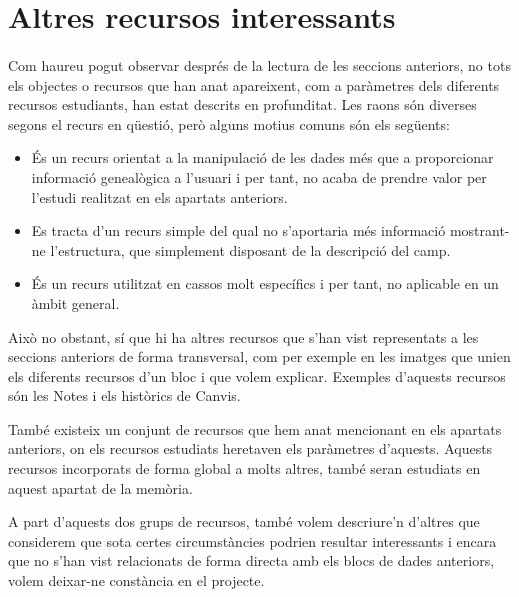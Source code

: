 \section{Altres recursos interessants}

    \paragraph{}
    Com haureu pogut observar després de la lectura de les seccions anteriors, no tots els objectes o recursos que han anat apareixent, com a paràmetres dels diferents recursos estudiants, han estat descrits en profunditat. Les raons són diverses segons el recurs en qüestió, però alguns motius comuns són els següents:

    \begin{itemize}
        \item És un recurs orientat a la manipulació de les dades més que a proporcionar informació genealògica a l'usuari i per tant, no acaba de prendre valor per l'estudi realitzat en els apartats anteriors.
        \item Es tracta d'un recurs simple del qual no s'aportaria més informació mostrant-ne l'estructura, que simplement disposant de la descripció del camp.
        \item És un recurs utilitzat en cassos molt específics i per tant, no aplicable en un àmbit general.
    \end{itemize}

    Això no obstant, sí que hi ha altres recursos que s'han vist representats a les seccions anteriors de forma transversal, com per exemple en les imatges que unien els diferents recursos d'un bloc i que volem explicar. Exemples d'aquests recursos són les Notes i els històrics de Canvis.

    També existeix un conjunt de recursos que hem anat mencionant en els apartats anteriors, on els recursos estudiats heretaven els paràmetres d'aquests. Aquests recursos incorporats de forma global a molts altres, també seran estudiats en aquest apartat de la memòria.

    A part d'aquests dos grups de recursos, també volem descriure'n d'altres que considerem que sota certes circumstàncies podrien resultar interessants i encara que no s'han vist relacionats de forma directa amb els blocs de dades anteriors, volem deixar-ne constància en el projecte.

    
    
    
    
    
    
    
    
    
    

